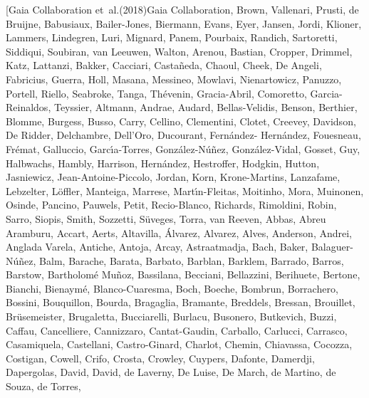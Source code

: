 \documentclass[twocolumn]{aastex62}
\begin{document}
\begin{thebibliography}{}
\bibitem[{{Gaia Collaboration} {et~al.}(2018){Gaia Collaboration}, {Brown},
  {Vallenari}, {Prusti}, {de Bruijne}, {Babusiaux}, {Bailer-Jones}, {Biermann},
  {Evans}, {Eyer}, {Jansen}, {Jordi}, {Klioner}, {Lammers}, {Lindegren},
  {Luri}, {Mignard}, {Panem}, {Pourbaix}, {Randich}, {Sartoretti}, {Siddiqui},
  {Soubiran}, {van Leeuwen}, {Walton}, {Arenou}, {Bastian}, {Cropper},
  {Drimmel}, {Katz}, {Lattanzi}, {Bakker}, {Cacciari}, {Casta{\~n}eda},
  {Chaoul}, {Cheek}, {De Angeli}, {Fabricius}, {Guerra}, {Holl}, {Masana},
  {Messineo}, {Mowlavi}, {Nienartowicz}, {Panuzzo}, {Portell}, {Riello},
  {Seabroke}, {Tanga}, {Th{\'e}venin}, {Gracia-Abril}, {Comoretto},
  {Garcia-Reinaldos}, {Teyssier}, {Altmann}, {Andrae}, {Audard},
  {Bellas-Velidis}, {Benson}, {Berthier}, {Blomme}, {Burgess}, {Busso},
  {Carry}, {Cellino}, {Clementini}, {Clotet}, {Creevey}, {Davidson}, {De
  Ridder}, {Delchambre}, {Dell'Oro}, {Ducourant}, {Fern{\'a}ndez-
  Hern{\'a}ndez}, {Fouesneau}, {Fr{\'e}mat}, {Galluccio}, {Garc{\'\i}a-Torres},
  {Gonz{\'a}lez-N{\'u}{\~n}ez}, {Gonz{\'a}lez-Vidal}, {Gosset}, {Guy},
  {Halbwachs}, {Hambly}, {Harrison}, {Hern{\'a}ndez}, {Hestroffer}, {Hodgkin},
  {Hutton}, {Jasniewicz}, {Jean-Antoine-Piccolo}, {Jordan}, {Korn},
  {Krone-Martins}, {Lanzafame}, {Lebzelter}, {L{\"o}ffler}, {Manteiga},
  {Marrese}, {Mart{\'\i}n-Fleitas}, {Moitinho}, {Mora}, {Muinonen}, {Osinde},
  {Pancino}, {Pauwels}, {Petit}, {Recio-Blanco}, {Richards}, {Rimoldini},
  {Robin}, {Sarro}, {Siopis}, {Smith}, {Sozzetti}, {S{\"u}veges}, {Torra}, {van
  Reeven}, {Abbas}, {Abreu Aramburu}, {Accart}, {Aerts}, {Altavilla},
  {{\'A}lvarez}, {Alvarez}, {Alves}, {Anderson}, {Andrei}, {Anglada Varela},
  {Antiche}, {Antoja}, {Arcay}, {Astraatmadja}, {Bach}, {Baker},
  {Balaguer-N{\'u}{\~n}ez}, {Balm}, {Barache}, {Barata}, {Barbato}, {Barblan},
  {Barklem}, {Barrado}, {Barros}, {Barstow}, {Bartholom{\'e} Mu{\~n}oz},
  {Bassilana}, {Becciani}, {Bellazzini}, {Berihuete}, {Bertone}, {Bianchi},
  {Bienaym{\'e}}, {Blanco-Cuaresma}, {Boch}, {Boeche}, {Bombrun}, {Borrachero},
  {Bossini}, {Bouquillon}, {Bourda}, {Bragaglia}, {Bramante}, {Breddels},
  {Bressan}, {Brouillet}, {Br{\"u}semeister}, {Brugaletta}, {Bucciarelli},
  {Burlacu}, {Busonero}, {Butkevich}, {Buzzi}, {Caffau}, {Cancelliere},
  {Cannizzaro}, {Cantat-Gaudin}, {Carballo}, {Carlucci}, {Carrasco},
  {Casamiquela}, {Castellani}, {Castro-Ginard}, {Charlot}, {Chemin},
  {Chiavassa}, {Cocozza}, {Costigan}, {Cowell}, {Crifo}, {Crosta}, {Crowley},
  {Cuypers}, {Dafonte}, {Damerdji}, {Dapergolas}, {David}, {David}, {de
  Laverny}, {De Luise}, {De March}, {de Martino}, {de Souza}, {de Torres},
}
\end{thebibliography}
\end{document}
